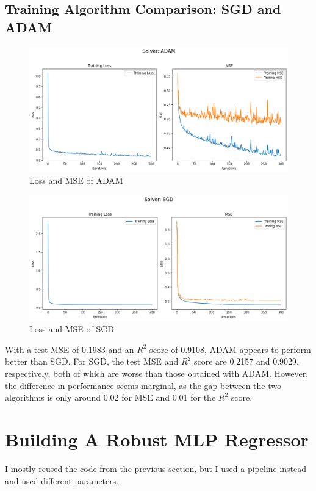 \documentclass[a4paper]{article}
\begin{document}
\subsection{Training Algorithm Comparison: SGD and ADAM}
\begin{figure}[htbp]
    \centering
    \includegraphics[width=0.9\linewidth]{2.11.png}
    \caption{\centering Loss and MSE of ADAM}
\end{figure}

\begin{figure}[htbp]
    \centering
    \includegraphics[width=0.9\linewidth]{2.12.png}
    \caption{\centering Loss and MSE of SGD}
\end{figure}
With a test MSE of 0.1983 and an \( R^2 \) score of 0.9108, ADAM appears to perform better than SGD. For SGD, the test MSE and \( R^2 \) score are 0.2157 and 0.9029, respectively, both of which are worse than those obtained with ADAM. However, the difference in performance seems marginal, as the gap between the two algorithms is only around 0.02 for MSE and 0.01 for the \( R^2 \) score.



\newpage
\section{Building A Robust MLP Regressor}
I mostly reused the code from the previous section, but I used a pipeline instead and used different parameters.
\end{document}
